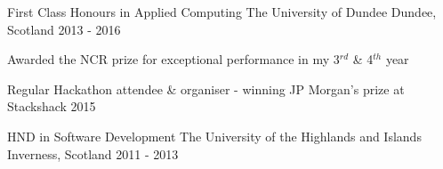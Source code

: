 

\begin{cventries}

  \cventry
    {First Class Honours in Applied Computing} %
    {The University of Dundee} %
    {Dundee, Scotland} %
    {2013 - 2016} %
    {
      \begin{cvitems} %
        \item {Awarded the NCR prize for exceptional performance in my 3$^{rd}$ \& 4$^{th}$ year}
        \item {Regular Hackathon attendee \& organiser - winning JP Morgan's prize at Stackshack 2015}
      \end{cvitems}
    }


  \cventry
  {HND in Software Development} %
  {The University of the Highlands and Islands} %
  {Inverness, Scotland} %
  {2011 - 2013} %
  {
    \begin{cvitems} %
     {}
    \end{cvitems}
  }

\end{cventries}
